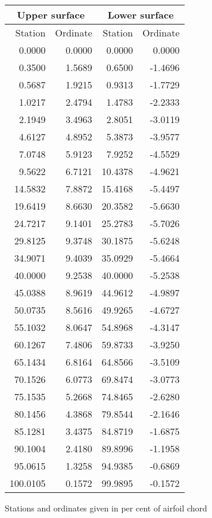 \documentclass[11pt]{book}
\begin{document}
 \hspace{4mm}
 \begin{tabular}{|r|r|r|r|} \hline 
 \multicolumn{2}{|c|}{Upper surface} & \multicolumn{2}{|c|}{Lower surface} \\
 \hline
 Station & Ordinate & Station & Ordinate \\
 \hline
0.0000 & 0.0000 & 0.0000 & 0.0000 \\
0.3500 & 1.5689 & 0.6500 & -1.4696 \\
0.5687 & 1.9215 & 0.9313 & -1.7729 \\
1.0217 & 2.4794 & 1.4783 & -2.2333 \\
2.1949 & 3.4963 & 2.8051 & -3.0119 \\
4.6127 & 4.8952 & 5.3873 & -3.9577 \\
7.0748 & 5.9123 & 7.9252 & -4.5529 \\
9.5622 & 6.7121 & 10.4378 & -4.9621 \\
14.5832 & 7.8872 & 15.4168 & -5.4497 \\
19.6419 & 8.6630 & 20.3582 & -5.6630 \\
24.7217 & 9.1401 & 25.2783 & -5.7026 \\
29.8125 & 9.3748 & 30.1875 & -5.6248 \\
34.9071 & 9.4039 & 35.0929 & -5.4664 \\
40.0000 & 9.2538 & 40.0000 & -5.2538 \\
45.0388 & 8.9619 & 44.9612 & -4.9897 \\
50.0735 & 8.5616 & 49.9265 & -4.6727 \\
55.1032 & 8.0647 & 54.8968 & -4.3147 \\
60.1267 & 7.4806 & 59.8733 & -3.9250 \\
65.1434 & 6.8164 & 64.8566 & -3.5109 \\
70.1526 & 6.0773 & 69.8474 & -3.0773 \\
75.1535 & 5.2668 & 74.8465 & -2.6280 \\
80.1456 & 4.3868 & 79.8544 & -2.1646 \\
85.1281 & 3.4375 & 84.8719 & -1.6875 \\
90.1004 & 2.4180 & 89.8996 & -1.1958 \\
95.0615 & 1.3258 & 94.9385 & -0.6869 \\
100.0105 & 0.1572 & 99.9895 & -0.1572 \\
 \hline 
 \end{tabular}
 \vspace{8mm}

Stations and ordinates given in per cent of airfoil chord
\end{document}
